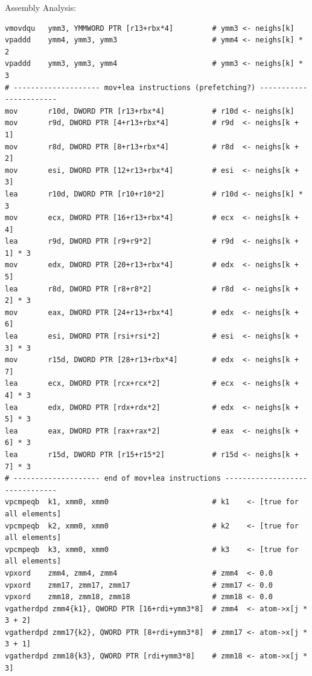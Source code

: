 \documentclass[aspectratio=169,t]{beamer}
\begin{document}
  \begin{frame}[fragile]{Assembly Analysis:}
    \vspace{-17.5pt}
    \begin{lstlisting}[language={[x64]Assembler},basicstyle=\tt\tiny]
vmovdqu   ymm3, YMMWORD PTR [r13+rbx*4]         # ymm3 <- neighs[k]
vpaddd    ymm4, ymm3, ymm3                      # ymm4 <- neighs[k] * 2
vpaddd    ymm3, ymm3, ymm4                      # ymm3 <- neighs[k] * 3
# -------------------- mov+lea instructions (prefetching?) -----------------------
mov       r10d, DWORD PTR [r13+rbx*4]           # r10d <- neighs[k]
mov       r9d, DWORD PTR [4+r13+rbx*4]          # r9d  <- neighs[k + 1]
mov       r8d, DWORD PTR [8+r13+rbx*4]          # r8d  <- neighs[k + 2]
mov       esi, DWORD PTR [12+r13+rbx*4]         # esi  <- neighs[k + 3]
lea       r10d, DWORD PTR [r10+r10*2]           # r10d <- neighs[k] * 3
mov       ecx, DWORD PTR [16+r13+rbx*4]         # ecx  <- neighs[k + 4]
lea       r9d, DWORD PTR [r9+r9*2]              # r9d  <- neighs[k + 1] * 3
mov       edx, DWORD PTR [20+r13+rbx*4]         # edx  <- neighs[k + 5]
lea       r8d, DWORD PTR [r8+r8*2]              # r8d  <- neighs[k + 2] * 3
mov       eax, DWORD PTR [24+r13+rbx*4]         # edx  <- neighs[k + 6]
lea       esi, DWORD PTR [rsi+rsi*2]            # esi  <- neighs[k + 3] * 3
mov       r15d, DWORD PTR [28+r13+rbx*4]        # edx  <- neighs[k + 7]
lea       ecx, DWORD PTR [rcx+rcx*2]            # ecx  <- neighs[k + 4] * 3
lea       edx, DWORD PTR [rdx+rdx*2]            # edx  <- neighs[k + 5] * 3
lea       eax, DWORD PTR [rax+rax*2]            # eax  <- neighs[k + 6] * 3
lea       r15d, DWORD PTR [r15+r15*2]           # r15d <- neighs[k + 7] * 3
# -------------------- end of mov+lea instructions -------------------------------
vpcmpeqb  k1, xmm0, xmm0                        # k1    <- [true for all elements]
vpcmpeqb  k2, xmm0, xmm0                        # k2    <- [true for all elements]
vpcmpeqb  k3, xmm0, xmm0                        # k3    <- [true for all elements]
vpxord    zmm4, zmm4, zmm4                      # zmm4  <- 0.0
vpxord    zmm17, zmm17, zmm17                   # zmm17 <- 0.0
vpxord    zmm18, zmm18, zmm18                   # zmm18 <- 0.0
vgatherdpd zmm4{k1}, QWORD PTR [16+rdi+ymm3*8]  # zmm4  <- atom->x[j * 3 + 2]
vgatherdpd zmm17{k2}, QWORD PTR [8+rdi+ymm3*8]  # zmm17 <- atom->x[j * 3 + 1]
vgatherdpd zmm18{k3}, QWORD PTR [rdi+ymm3*8]    # zmm18 <- atom->x[j * 3]
    \end{lstlisting}
  \end{frame}
\end{document}
